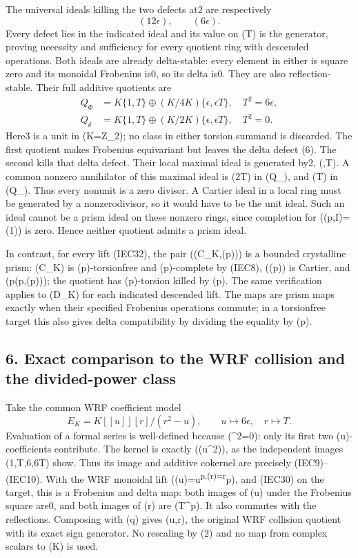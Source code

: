 \documentclass[
  10pt,
]{article}
\begin{document}
The universal ideals killing the two defects at2 are respectively \[
(12\epsilon),\qquad(6\epsilon).
\tag{IEC35}
\] Every defect lies in the indicated ideal and its value on (T) is the
generator, proving necessity and sufficiency for every quotient ring
with descended operations. Both ideals are already delta-stable: every
element in either is square zero and its monoidal Frobenius is0, so its
delta is0. They are also reflection-stable. Their full additive
quotients are \[
\begin{aligned}
Q_\Phi&=K\{1,T\}\oplus(K/4K)\{\epsilon,\epsilon T\},\quad T^2=6\epsilon,\\
Q_\delta&=K\{1,T\}\oplus(K/2K)\{\epsilon,\epsilon T\},\quad T^2=0.
\end{aligned}
\tag{IEC36}
\] Here3 is a unit in (K=\mathbb Z\_2); no class in either torsion
summand is discarded. The first quotient makes Frobenius equivariant but
leaves the delta defect (6\epsilon{}). The second kills that delta
defect. Their local maximal ideal is generated by2, (\epsilon,T). A
common nonzero annihilator of this maximal ideal is (2\epsilon T) in
(Q\_\Phi), and (\epsilon T) in (Q\_\delta). Thus every nonunit is a zero
divisor. A Cartier ideal in a local ring must be generated by a
nonzerodivisor, so it would have to be the unit ideal. Such an ideal
cannot be a prism ideal on these nonzero rings, since completion for
((p,I)=(1)) is zero. Hence neither quotient admits a prism ideal.

In contrast, for every lift (IEC32), the pair ((C\_K,(p))) is a bounded
crystalline prism: (C\_K) is (p)-torsionfree and (p)-complete by (IEC8),
((p)) is Cartier, and (p\in(p,\Phi(p))); the quotient has (p)-torsion
killed by (p). The same verification applies to (D\_K) for each
indicated descended lift. The maps are prism maps exactly when their
specified Frobenius operations commute; in a torsionfree target this
also gives delta compatibility by dividing the equality by (p).

\subsection{6. Exact comparison to the WRF collision and the
divided-power
class}\label{exact-comparison-to-the-wrf-collision-and-the-divided-power-class}

Take the common WRF coefficient model \[
E_K=K[[u]][r]/(r^2-u),\qquad
u\longmapsto6\epsilon,\quad r\longmapsto T.
\tag{IEC37}
\] Evaluation of a formal series is well-defined because
(\epsilon\^{}2=0): only its first two (u)-coefficients contribute. The
kernel is exactly ((u\^{}2)), as the independent images
(1,T,6\epsilon,6\epsilon T) show. Thus its image and additive cokernel
are precisely (IEC9)--(IEC10). With the WRF monoidal lift
(\Phi(u)=u\textsuperscript{p,\Phi(r)=r}p), and (IEC30) on the target,
this is a Frobenius and delta map: both images of (u) under the
Frobenius square are0, and both images of (r) are (T\^{}p). It also
commutes with the reflections. Composing with (q) gives
(u,r\mapsto\eta), the original WRF collision quotient with its
exact sign generator. No rescaling by (2) and no map from complex
scalars to (K) is used.
\end{document}
